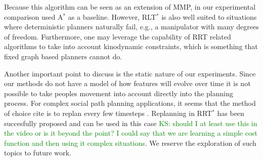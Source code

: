 \documentclass{article}  %
\newcommand{\ks}[1]{\textcolor{green}{KS: #1}}
\begin{document}
Because this algorithm can be seen as an extension of MMP, in our experimental comparison used A$^*$ as a baseline. However, RLT$^*$ is also well suited to situations where deterministic planners naturally fail, e.g., a manipulator with many degrees of freedom. Furthermore, one may leverage the capability of RRT related algorithms to take into account kinodynamic constraints, which is something that fixed graph based planners cannot do. 

Another important point to discuss is the static nature of our experiments. Since our methods do not have a model of how features will evolve over time it is not possible to take peoples movement into account directly into the planning process. For complex social path planning applications, it seems that the method of choice cite  is to replan every few timesteps \cite{vasquez2014inverse} \cite{henry2010learning}. Replanning in RRT$^*$ has been succesfully proposed and can be used in this case \cite{otte2015rrtx} \ks{should I at least use this in the video or is it beyond the point? I could say that we are learning a simple cost function and then using it complex situations}. We reserve the exploration of such topics to future work. 


\end{document}
